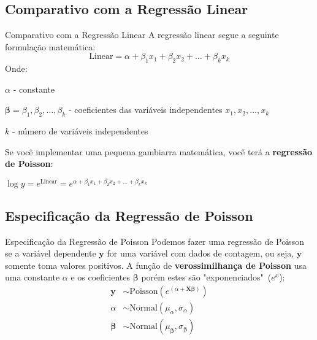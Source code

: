 \subsection{Comparativo com a Regressão Linear}
\begin{frame}{Comparativo com a Regressão Linear}
    A regressão linear segue a seguinte formulação matemática:
    \small
    $$
    \text{Linear} = \alpha + \beta_1 x_1 + \beta_2 x_2 + \ldots + \beta_k x_k
    $$
    Onde:
    \begin{vfilleditems}
        \item \small $\alpha$ - constante
        \item \small $\boldsymbol{\beta} = \beta_1, \beta_2, \dots, \beta_k$ - coeficientes das variáveis independentes $x_1, x_2, \dots, x_k$
        \item \small $k$ - número de variáveis independentes
    \end{vfilleditems}
    Se você implementar uma pequena gambiarra matemática, você terá a \textbf{regressão de Poisson}:
    \begin{vfilleditems}
        \item \small $\log{y} = e^{\text{Linear}} = e^{\alpha + \beta_1 x_1 + \beta_2 x_2 + \ldots + \beta_k x_k}$
    \end{vfilleditems}
\end{frame}

\subsection{Especificação da Regressão de Poisson}
\begin{frame}{Especificação da Regressão de Poisson}
    Podemos fazer uma regressão de Poisson se a variável dependente
    $\boldsymbol{y}$ for uma variável com dados de contagem, ou seja,
    $\boldsymbol{y}$ somente toma valores positivos. A função de \textbf{verossimilhança de
    Poisson} usa uma constante $\alpha$ e os coeficientes $\boldsymbol{\beta}$
    porém estes são "exponenciados"~($e^x$):
    $$
    \begin{aligned}
    \boldsymbol{y} &\sim \text{Poisson}\left( e^{(\alpha +  \mathbf{X} \boldsymbol{\beta})} \right) \\
    \alpha &\sim \text{Normal}(\mu_\alpha, \sigma_\alpha) \\
    \boldsymbol{\beta} &\sim \text{Normal}(\mu_{\boldsymbol{\beta}}, \sigma_{\boldsymbol{\beta}})
    \end{aligned}
    $$
\end{frame}

